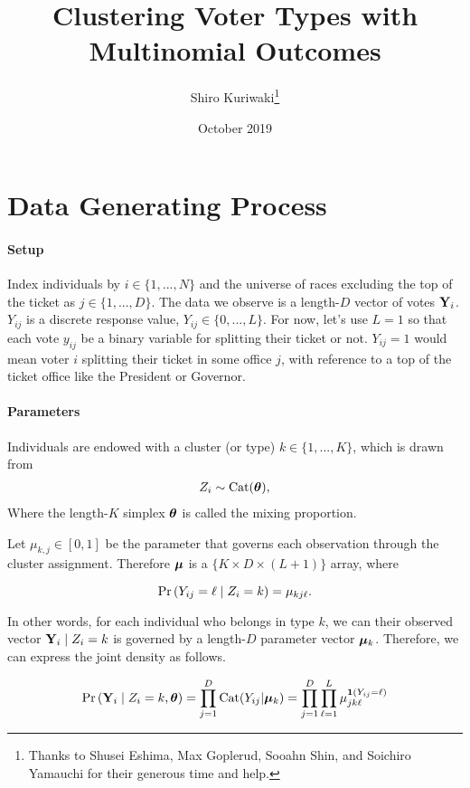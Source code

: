 \documentclass[11pt]{article}
\title{ \Large\textbf{Clustering Voter Types with Multinomial Outcomes}}
\author{\normalsize  Shiro Kuriwaki\thanks{Thanks to Shusei Eshima, Max Goplerud, Sooahn Shin, and Soichiro Yamauchi for their generous time and help.} }
\date{\normalsize October 2019}
\begin{document}
\maketitle

\onehalfspacing


\section{Data Generating Process}


\paragraph{Setup}

Index individuals by \(i \in \{1, ..., N\}\) and the universe of races
excluding the top of the ticket as \(j \in \{1, ..., D\}\). The data we
observe is a length-\(D\) vector of votes \(\mathbf{Y}_i\). \(Y_{ij}\) is a
discrete response value, \(Y_{ij} \in \{0, ..., L\}\). For now, let's use \(L = 1\) so that each vote \(y_{ij}\) be a binary variable for splitting their ticket or not. \(Y_{ij} = 1\) would mean voter \(i\) splitting their ticket in some office \(j\), with reference to a top of the ticket office like the President or Governor.


\paragraph{Parameters}


Individuals are endowed with a cluster (or type) \(k \in \{1, ..., K\}\), which is drawn from 
\begin{align*}
Z_i \sim  \text{Cat}(\bm{\theta}),
\end{align*}
Where the length-\(K\) simplex \(\bm{\theta}\) is called the mixing proportion.

Let \(\mu_{k, j} \in [0, 1]\) be the parameter that governs each observation through the cluster assignment. Therefore \(\bm{\mu}\) is a \(\{K \times D \times (L + 1)\}\) array, where 

 \[\mathbb{\Pr}\left(Y_{ij} = \ell \mid Z_i = k\right) = \mu_{kj\ell}.\]

In other words, for each individual who belongs in type \(k\), we can their observed vector \(\mathbf{Y}_{i} \mid Z_i = k\) is governed by a length-\(D\) parameter vector \(\bm{\mu}_{k}\). Therefore, we can express the joint density as follows. 

\begin{align}
\mathbb{\Pr}\left(\mathbf{Y}_{i} \mid Z_{i} = k, \bm{\theta}\right) = \prod^{D}_{j = 1} \text{Cat}(Y_{ij} | \bm{\mu}_k) = \prod^{D}_{j = 1}\prod^{L}_{\ell=1} \mu_{jk\ell}^{\bm{1}\left(Y_{ij} = \ell\right)}
\end{align}
\end{document}
